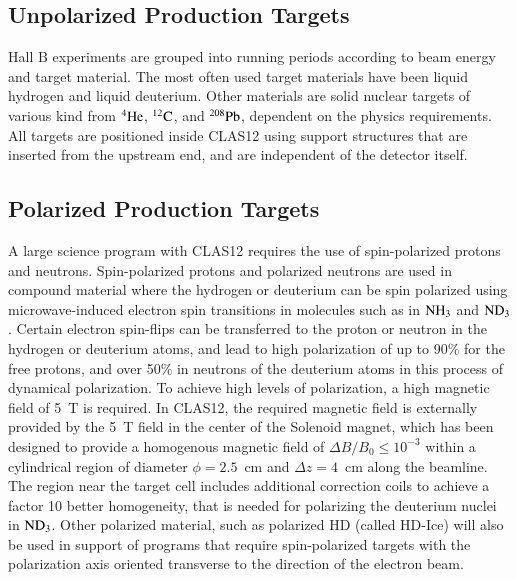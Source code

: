 \documentclass[final,3p,times,twocolumn,authoryear]{elsarticle}
\begin{document}
\subsection{\rm Unpolarized Production Targets} 
Hall B experiments are grouped into running periods according to beam energy and target material. 
The most often used target materials have been liquid hydrogen and liquid deuterium. Other materials are solid nuclear targets of various kind from $\rm ^4He$, $\rm ^{12}C$, and $\rm ^{208}Pb$, dependent on the physics requirements. All targets are positioned 
 inside CLAS12 using support structures that are inserted from the upstream end, and are independent 
 of the detector itself. 
 \subsection{\rm Polarized Production Targets} 
 A large science program with CLAS12 requires the use of spin-polarized protons and neutrons. 
 Spin-polarized protons and polarized neutrons are used in compound material where the hydrogen or 
 deuterium can be spin polarized using microwave-induced electron spin transitions in molecules such as 
 in $\rm NH_3$ and $\rm ND_3$. Certain electron spin-flips can be transferred to the proton or neutron in the 
 hydrogen or deuterium atoms, and lead to high polarization of up to 90\% for the free protons, and 
 over 50\% in neutrons of the deuterium atoms in this process of dynamical polarization. To achieve 
 high levels of polarization, a high magnetic field of 5~T is required. In CLAS12, the required magnetic 
 field is externally 
 provided by the 5~T field in the center of the Solenoid magnet, which has been designed to provide 
 a homogenous magnetic field of $\Delta B / B_0 \leq 10^{-3}$ within a cylindrical region of diameter 
 $\phi = 2.5$~cm and $\Delta{z} = 4$~cm along the beamline.  The region near the target cell includes 
 additional correction coils to achieve a factor 10 better homogeneity, that is needed for polarizing 
 the deuterium nuclei in $\rm ND_3$. Other polarized material, such as polarized HD (called HD-Ice)  
will also be used in support of programs that require spin-polarized targets with the polarization axis 
oriented transverse to the direction of the electron beam.        
\end{document}
